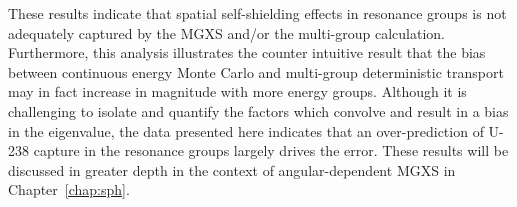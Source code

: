 These results indicate that spatial self-shielding effects in resonance groups is not adequately captured by the \ac{MGXS} and/or the multi-group calculation. Furthermore, this analysis illustrates the counter intuitive result that the bias between continuous energy Monte Carlo and multi-group deterministic transport may in fact increase in magnitude with more energy groups. Although it is challenging to isolate and quantify the factors which convolve and result in a bias in the eigenvalue, the data presented here indicates that an over-prediction of U-238 capture in the resonance groups largely drives the error. These results will be discussed in greater depth in the context of angular-dependent \ac{MGXS} in Chapter~\ref{chap:sph}.



